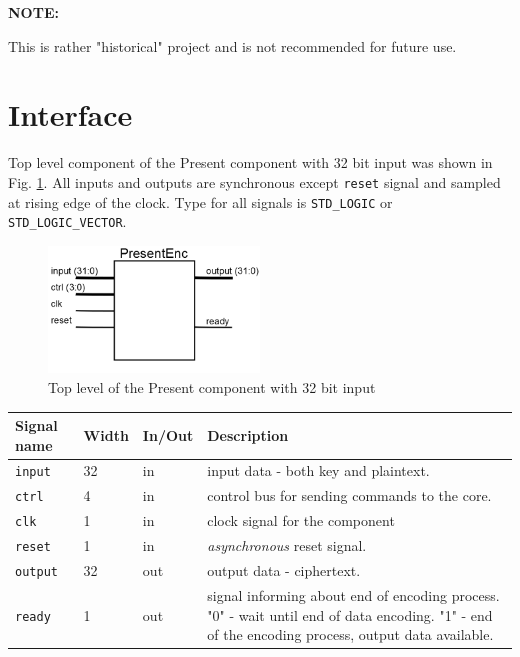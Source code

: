 \documentclass{gajewski}
\begin{document}
\textbf{NOTE:}

This is rather "historical" project and is not recommended for future use.

\newpage 

\section{Interface}

Top level component of the Present component with 32 bit input was shown in Fig. \ref{penc}. All inputs and outputs are synchronous except \texttt{reset} signal and sampled at rising edge of the clock. Type for all signals is \texttt{STD\_LOGIC} or \texttt{STD\_LOGIC\_VECTOR}.
\begin{figure}[!ht]%
    \begin{center}
    \includegraphics[width=0.5\textwidth]{img/PresentEnc.png}
    \caption{%
        Top level of the Present component with 32 bit input
     }%
    \label{penc}
    \end{center}
 \end{figure}

\begin{tabularx}{\textwidth}{|p{30mm}|p{11mm}|p{11mm}|X|}
  \hline \bf{Signal name} & \bf{Width} & \bf{In/Out} & \bf{Description}\\ 
  \hline \texttt{input}	& 32  &  in  & input data - both key and plaintext. \\ 
  \hline \texttt{ctrl}	& 4  &  in  & control bus for sending commands to the core. \\ 
  \hline \texttt{clk}	& 1  &  in  &  clock signal for the component\\ 
  \hline \texttt{reset} & 1   &  in  & \emph{asynchronous} reset signal.	\\ 
  \hline \texttt{output} & 32   &  out  & output data - ciphertext. \\ 
  \hline \texttt{ready} & 1   &  out  & signal informing about end of encoding process. \newline  "0" - wait until end of data encoding. \newline  "1" - end of the encoding process, output data available. \\ 
  \hline
\end{tabularx}
\end{document}
